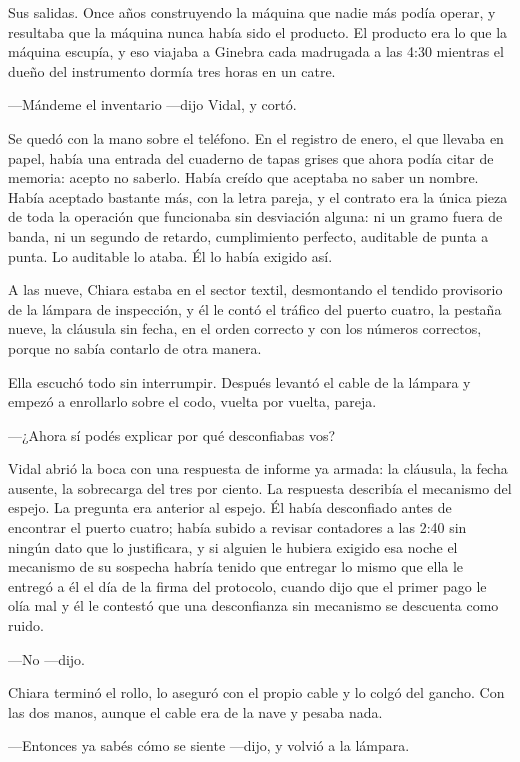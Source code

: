Sus salidas. Once años construyendo la máquina que nadie más podía operar, y resultaba que la máquina nunca había sido el producto. El producto era lo que la máquina escupía, y eso viajaba a Ginebra cada madrugada a las 4:30 mientras el dueño del instrumento dormía tres horas en un catre.

---Mándeme el inventario ---dijo Vidal, y cortó.

Se quedó con la mano sobre el teléfono. En el registro de enero, el que llevaba en papel, había una entrada del cuaderno de tapas grises que ahora podía citar de memoria: acepto no saberlo. Había creído que aceptaba no saber un nombre. Había aceptado bastante más, con la letra pareja, y el contrato era la única pieza de toda la operación que funcionaba sin desviación alguna: ni un gramo fuera de banda, ni un segundo de retardo, cumplimiento perfecto, auditable de punta a punta. Lo auditable lo ataba. Él lo había exigido así.

A las nueve, Chiara estaba en el sector textil, desmontando el tendido provisorio de la lámpara de inspección, y él le contó el tráfico del puerto cuatro, la pestaña nueve, la cláusula sin fecha, en el orden correcto y con los números correctos, porque no sabía contarlo de otra manera.

Ella escuchó todo sin interrumpir. Después levantó el cable de la lámpara y empezó a enrollarlo sobre el codo, vuelta por vuelta, pareja.

---¿Ahora sí podés explicar por qué desconfiabas vos?

Vidal abrió la boca con una respuesta de informe ya armada: la cláusula, la fecha ausente, la sobrecarga del tres por ciento. La respuesta describía el mecanismo del espejo. La pregunta era anterior al espejo. Él había desconfiado antes de encontrar el puerto cuatro; había subido a revisar contadores a las 2:40 sin ningún dato que lo justificara, y si alguien le hubiera exigido esa noche el mecanismo de su sospecha habría tenido que entregar lo mismo que ella le entregó a él el día de la firma del protocolo, cuando dijo que el primer pago le olía mal y él le contestó que una desconfianza sin mecanismo se descuenta como ruido.

---No ---dijo.

Chiara terminó el rollo, lo aseguró con el propio cable y lo colgó del gancho. Con las dos manos, aunque el cable era de la nave y pesaba nada.

---Entonces ya sabés cómo se siente ---dijo, y volvió a la lámpara.

